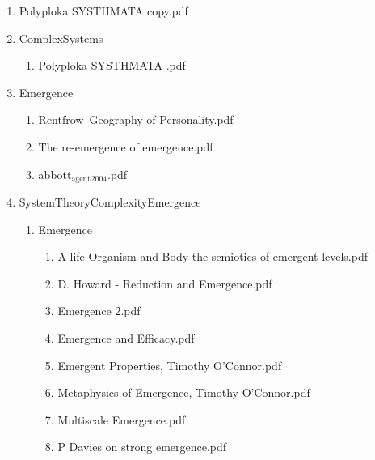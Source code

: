 \documentclass[11pt]{article}
\begin{document}
\begin{enumerate}
\begin{enumerate}
\item Polyploka SYSTHMATA  copy.pdf
\label{sec-1-1-1-1-11-8-2}

\item ComplexSystems
\label{sec-1-1-1-1-11-8-3}
\begin{enumerate}
\item Polyploka SYSTHMATA .pdf
\label{sec-1-1-1-1-11-8-3-1}
\end{enumerate}

\item Emergence
\label{sec-1-1-1-1-11-8-4}
\begin{enumerate}
\item Rentfrow--Geography of Personality.pdf
\label{sec-1-1-1-1-11-8-4-1}

\item The re-emergence of emergence.pdf
\label{sec-1-1-1-1-11-8-4-2}

\item abbott$_{\text{agent}}$$_{\text{2004}}$.pdf
\label{sec-1-1-1-1-11-8-4-3}
\end{enumerate}

\item SystemTheoryComplexityEmergence
\label{sec-1-1-1-1-11-8-5}
\begin{enumerate}
\item Emergence
\label{sec-1-1-1-1-11-8-5-1}
\begin{enumerate}
\item A-life Organism and Body the semiotics of emergent levels.pdf
\label{sec-1-1-1-1-11-8-5-1-1}

\item D. Howard - Reduction and Emergence.pdf
\label{sec-1-1-1-1-11-8-5-1-2}

\item Emergence 2.pdf
\label{sec-1-1-1-1-11-8-5-1-3}

\item Emergence and Efficacy.pdf
\label{sec-1-1-1-1-11-8-5-1-4}

\item Emergent Properties, Timothy O'Connor.pdf
\label{sec-1-1-1-1-11-8-5-1-5}

\item Metaphysics of Emergence, Timothy O'Connor.pdf
\label{sec-1-1-1-1-11-8-5-1-6}

\item Multiscale Emergence.pdf
\label{sec-1-1-1-1-11-8-5-1-7}

\item P Davies on strong emergence.pdf
\label{sec-1-1-1-1-11-8-5-1-8}


\end{enumerate}
\end{enumerate}
\end{enumerate}
\end{enumerate}
\end{document}
